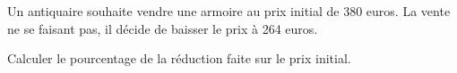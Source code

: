 
Un antiquaire souhaite vendre une armoire au prix initial de 380 euros. La vente ne se faisant pas, il décide de baisser le prix à 264 euros. 

Calculer le pourcentage de la réduction faite sur le prix initial.
